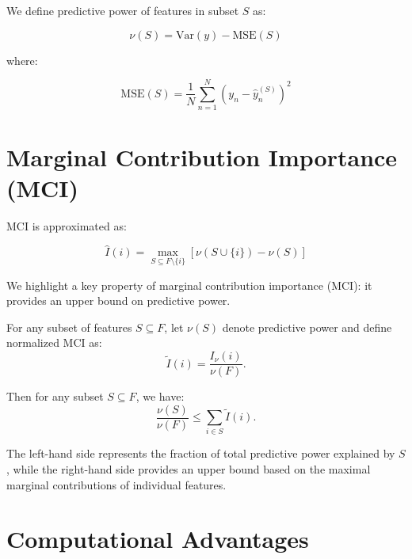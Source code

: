 \documentclass[11pt]{article}
\begin{document}
We define predictive power of features in subset $S$ as:

\begin{equation}
\nu(S) = \mathrm{Var}(y) - \mathrm{MSE}(S)
\end{equation}

where:

\begin{equation}
\mathrm{MSE}(S) = \frac{1}{N} \sum_{n=1}^N (y_n - \hat{y}_n^{(S)})^2
\end{equation}

\section{Marginal Contribution Importance (MCI)}

MCI is approximated as:

\begin{equation}
\widehat{I}(i) = \max_{S \subseteq F \setminus \{i\}} \left[\nu(S \cup \{i\}) - \nu(S)\right]
\end{equation}


We highlight a key property of marginal contribution importance (MCI): it provides an upper bound on predictive power.


For any subset of features $S \subseteq F$, let $\nu(S)$ denote predictive power and define normalized MCI as:
\begin{equation}
\tilde I(i) = \frac{I_\nu(i)}{\nu(F)}.
\end{equation}

Then for any subset $S \subseteq F$, we have:
\begin{equation}
\frac{\nu(S)}{\nu(F)} \le \sum_{i \in S} \tilde I(i).
\end{equation}

The left-hand side represents the fraction of total predictive power explained by $S$, 
while the right-hand side provides an upper bound based on the maximal marginal contributions 
of individual features. 




\section{Computational Advantages}
\end{document}

